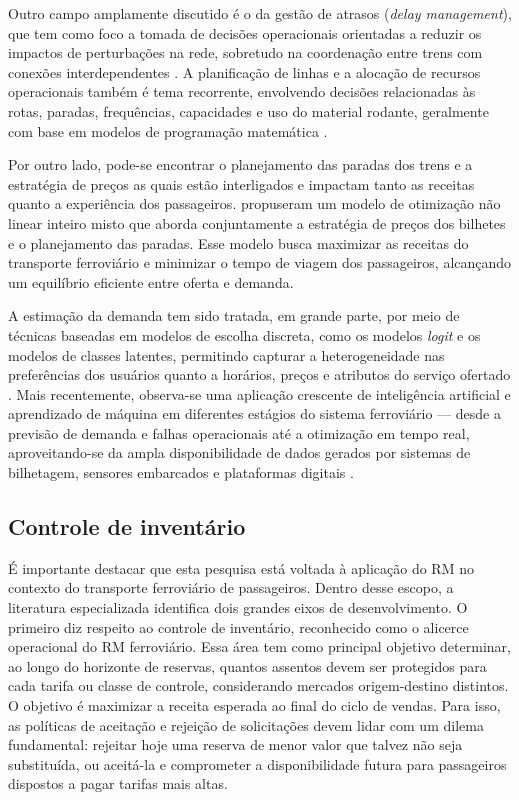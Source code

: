 Outro campo amplamente discutido é o da gestão de atrasos (\textit{delay management}), que tem como foco a tomada de decisões operacionais orientadas a reduzir os impactos de perturbações na rede, sobretudo na coordenação entre trens com conexões interdependentes \citep{Konig2020}. A planificação de linhas e a alocação de recursos operacionais também é tema recorrente, envolvendo decisões relacionadas às rotas, paradas, frequências, capacidades e uso do material rodante, geralmente com base em modelos de programação matemática \citep{Huisman_2005, Shan2024}.

Por outro lado, pode-se encontrar o planejamento das paradas dos trens e a estratégia de preços as quais estão interligados e impactam tanto as receitas quanto a experiência dos passageiros. \citet{zhou2022nonlinear} propuseram um modelo de otimização não linear inteiro misto que aborda conjuntamente a estratégia de preços dos bilhetes e o planejamento das paradas. Esse modelo busca maximizar as receitas do transporte ferroviário e minimizar o tempo de viagem dos passageiros, alcançando um equilíbrio eficiente entre oferta e demanda.

A estimação da demanda tem sido tratada, em grande parte, por meio de técnicas baseadas em modelos de escolha discreta, como os modelos \textit{logit} e os modelos de classes latentes, permitindo capturar a heterogeneidade nas preferências dos usuários quanto a horários, preços e atributos do serviço ofertado \citep{HETRAKUL201468, TANG2022}. Mais recentemente, observa-se uma aplicação crescente de inteligência artificial e aprendizado de máquina em diferentes estágios do sistema ferroviário — desde a previsão de demanda e falhas operacionais até a otimização em tempo real, aproveitando-se da ampla disponibilidade de dados gerados por sistemas de bilhetagem, sensores embarcados e plataformas digitais \citep{Besinovic2022, TANG2022}.

\subsection{Controle de inventário}

É importante destacar que esta pesquisa está voltada à aplicação do RM no contexto do transporte ferroviário de passageiros. Dentro desse escopo, a literatura especializada identifica dois grandes eixos de desenvolvimento. O primeiro diz respeito ao controle de inventário, reconhecido como o alicerce operacional do RM ferroviário. Essa área tem como principal objetivo determinar, ao longo do horizonte de reservas, quantos assentos devem ser protegidos para cada tarifa ou classe de controle, considerando mercados origem-destino distintos. O objetivo é maximizar a receita esperada ao final do ciclo de vendas. Para isso, as políticas de aceitação e rejeição de solicitações devem lidar com um dilema fundamental: rejeitar hoje uma reserva de menor valor que talvez não seja substituída, ou aceitá-la e comprometer a disponibilidade futura para passageiros dispostos a pagar tarifas mais altas.


